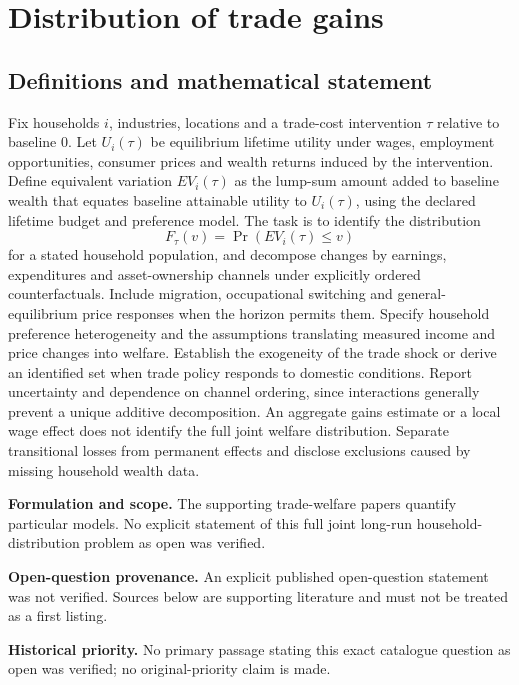 \documentclass[11pt]{article}
\begin{document}
\section*{Distribution of trade gains}\label{30007622}
\subsection{Definitions and mathematical statement}
Fix households \(i\), industries, locations and a trade-cost intervention \(\tau\) relative to baseline \(0\). Let \(U_i(\tau)\) be equilibrium lifetime utility under wages, employment opportunities, consumer prices and wealth returns induced by the intervention. Define equivalent variation \(EV_i(\tau)\) as the lump-sum amount added to baseline wealth that equates baseline attainable utility to \(U_i(\tau)\), using the declared lifetime budget and preference model. The task is to identify the distribution
\[F_{\tau}(v)=\Pr(EV_i(\tau)\leq v)\]
for a stated household population, and decompose changes by earnings, expenditures and asset-ownership channels under explicitly ordered counterfactuals. Include migration, occupational switching and general-equilibrium price responses when the horizon permits them. Specify household preference heterogeneity and the assumptions translating measured income and price changes into welfare. Establish the exogeneity of the trade shock or derive an identified set when trade policy responds to domestic conditions. Report uncertainty and dependence on channel ordering, since interactions generally prevent a unique additive decomposition. An aggregate gains estimate or a local wage effect does not identify the full joint welfare distribution. Separate transitional losses from permanent effects and disclose exclusions caused by missing household wealth data.

\par\textbf{Formulation and scope.} The supporting trade-welfare papers quantify particular models. No explicit statement of this full joint long-run household-distribution problem as open was verified.

\par\textbf{Open-question provenance.} An explicit published open-question statement was not verified. Sources below are supporting literature and must not be treated as a first listing.

\par\textbf{Historical priority.} No primary passage stating this exact catalogue question as open was verified; no original-priority claim is made.
\end{document}
